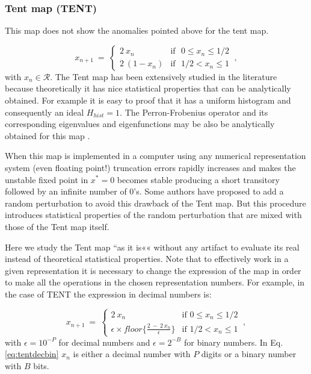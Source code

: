 \subsubsection{Tent map (TENT)} \label{sssec:tent}

This map does not show the anomalies pointed above for the tent map.

\begin{equation}\label{eq:tentmap}
x_{n+1}~=~ \left\{ \begin{array}{ll}
2~{x_n} & \textrm{if ~$0\leq x_n\leq 1/2$}\\
2~(1-{x_n}) & \textrm{if ~$1/2<x_n\leq 1$} 
\end{array} \right.  \ ,
\end{equation}
with $x_n\in\mathcal{R}$.
%
The Tent map has been extensively studied in the literature because theoretically it has nice  statistical properties that can be analytically obtained. For example it is easy to proof that it has a uniform histogram and consequently an ideal $H_{hist}=1$. The Perron-Frobenius operator and its corresponding eigenvalues and eigenfunctions may be also be analytically obtained for this map \cite{tent}. 

When this map is implemented in a computer using any numerical representation system (even floating point!) truncation errors rapidly increases and makes the unstable fixed point in $x^*=0$ becomes stable producing a short transitory followed by an infinite number of  $0$'s\cite{Jessa1993,Callegari1997}. Some authors \cite{buscar} have proposed to add a random perturbation to avoid this drawback of the Tent map. But this procedure introduces statistical properties of the random perturbation that are mixed with those of the Tent map itself.

Here we study the Tent map ``as it is«« without any artifact to evaluate its real instead of theoretical statistical properties. Note that to effectively work in a given representation it is necessary to change the expression of the map in order to make all the operations in the chosen representation numbers. For example, in the case of TENT the expression in decimal numbers is:

\begin{equation}\label{eq:tentdecbin}
x_{n+1}~=~ \left\{ \begin{array}{ll}
2~{x_n} & \textrm{if $0\leq x_n\leq 1/2$}\\
\epsilon \times floor\{\frac{2~-~2~x_n}{\epsilon}\} & \textrm{if $1/2<x_n\leq 1$} 
\end{array} \right.  \ ,
\end{equation}
with $\epsilon=10^{-P}$ for decimal numbers and $\epsilon=2^{-B}$ for binary numbers. In Eq. \ref{eq:tentdecbin} $x_n$ is either a decimal number with $P$ digits or a binary number with $B$ bits.

